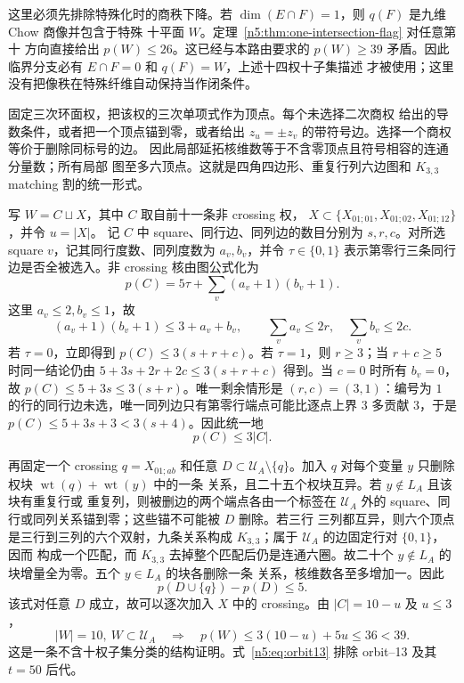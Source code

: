 这里必须先排除特殊化时的商秩下降。若
\(\dim(E\cap F)=1\)，则 \(q(F)\) 是九维 Chow 商像并包含于特殊
十平面 \(W\)。定理~\ref{n5:thm:one-intersection-flag} 对任意第十
方向直接给出 \(p(W)\le26\)。这已经与本路由要求的
\(p(W)\ge39\) 矛盾。因此
临界分支必有 \(E\cap F=0\) 和 \(q(F)=W\)，上述十四权十子集描述
才被使用；这里没有把像秩在特殊纤维自动保持当作闭条件。

固定三次环面权，把该权的三次单项式作为顶点。每个未选择二次商权
给出的导数条件，或者把一个顶点锚到零，或者给出
\(z_u=\pm z_v\) 的带符号边。选择一个商权等价于删除同标号的边。
因此局部延拓核维数等于不含零顶点且符号相容的连通分量数；所有局部
图至多六顶点。这就是四角四边形、重复行列六边图和 \(K_{3,3}\)
matching 割的统一形式。

写 \(W=C\sqcup X\)，其中 \(C\) 取自前十一条非 crossing 权，
\(X\subset\{X_{01;01},X_{01;02},X_{01;12}\}\)，并令 \(u=|X|\)。
记 \(C\) 中 square、同行边、同列边的数目分别为 \(s,r,c\)。对所选
square \(v\)，记其同行度数、同列度数为 \(a_v,b_v\)，并令
\(\tau\in\{0,1\}\) 表示第零行三条同行边是否全被选入。非 crossing
核由图公式化为
\[
p(C)=5\tau+\sum_v(a_v+1)(b_v+1).
\]
这里 \(a_v\le2,b_v\le1\)，故
\[
(a_v+1)(b_v+1)\le3+a_v+b_v,\qquad
\sum_va_v\le2r,\quad\sum_vb_v\le2c.
\]
若 \(\tau=0\)，立即得到 \(p(C)\le3(s+r+c)\)。若 \(\tau=1\)，则
\(r\ge3\)；当 \(r+c\ge5\) 时同一结论仍由
\(5+3s+2r+2c\le3(s+r+c)\) 得到。当 \(c=0\) 时所有 \(b_v=0\)，故
\(p(C)\le5+3s\le3(s+r)\)。唯一剩余情形是 \((r,c)=(3,1)\)：编号为
\(1\) 的行的同行边未选，唯一同列边只有第零行端点可能比逐点上界 \(3\) 多贡献
\(3\)，于是 \(p(C)\le5+3s+3<3(s+4)\)。因此统一地
\[
p(C)\le3|C|.
\]

再固定一个 crossing \(q=X_{01;ab}\) 和任意
\(D\subset\mathcal U_A\setminus\{q\}\)。加入 \(q\) 对每个变量 \(y\)
只删除权块 \(\operatorname{wt}(q)+\operatorname{wt}(y)\) 中的一条
关系，且二十五个权块互异。若 \(y\notin L_A\) 且该块有重复行或
重复列，则被删边的两个端点各由一个标签在 \(\mathcal U_A\) 外的
square、同行或同列关系锚到零；这些锚不可能被 \(D\) 删除。若三行
三列都互异，则六个顶点是三行到三列的六个双射，九条关系构成
\(K_{3,3}\)；属于 \(\mathcal U_A\) 的边固定行对 \(\{0,1\}\)，因而
构成一个匹配，而 \(K_{3,3}\) 去掉整个匹配后仍是连通六圈。故二十个
\(y\notin L_A\) 的块增量全为零。五个 \(y\in L_A\) 的块各删除一条
关系，核维数各至多增加一。因此
\[
p(D\cup\{q\})-p(D)\le5.
\]
该式对任意 \(D\) 成立，故可以逐次加入 \(X\) 中的 crossing。由
\(|C|=10-u\) 及 \(u\le3\)，
\begin{equation}\label{n5:eq:orbit13}
 |W|=10,\ W\subset\mathcal U_A\quad\Longrightarrow\quad
 p(W)\le3(10-u)+5u\le36<39.
\end{equation}
这是一条不含十权子集分类的结构证明。式~\eqref{n5:eq:orbit13}
排除 orbit--13 及其 \(t=50\) 后代。

